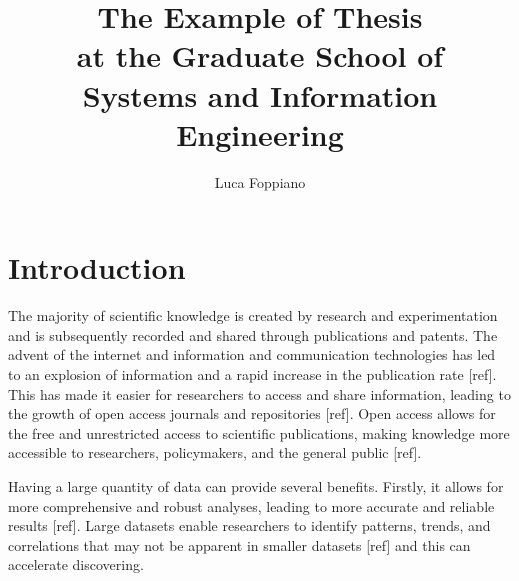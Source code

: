 \documentclass[12pt, a4paper]{report}
\title{The Example of Thesis \\ at the Graduate School of \\ Systems and Information Engineering}
\author{Luca Foppiano}
\begin{document}
\maketitle
\makeabstract
\maketableofcontents


\chapter{Introduction}





The majority of scientific knowledge is created by research and experimentation and is subsequently recorded and shared through publications and patents. 
The advent of the internet and information and communication technologies has led to an explosion of information and a rapid increase in the publication rate [ref]. 
This has made it easier for researchers to access and share information, leading to the growth of open access journals and repositories [ref]. 
Open access allows for the free and unrestricted access to scientific publications, making knowledge more accessible to researchers, policymakers, and the general public [ref]. 

Having a large quantity of data can provide several benefits. Firstly, it allows for more comprehensive and robust analyses, leading to more accurate and reliable results [ref]. 
Large datasets enable researchers to identify patterns, trends, and correlations that may not be apparent in smaller datasets [ref] and this can accelerate discovering.

\end{document}
